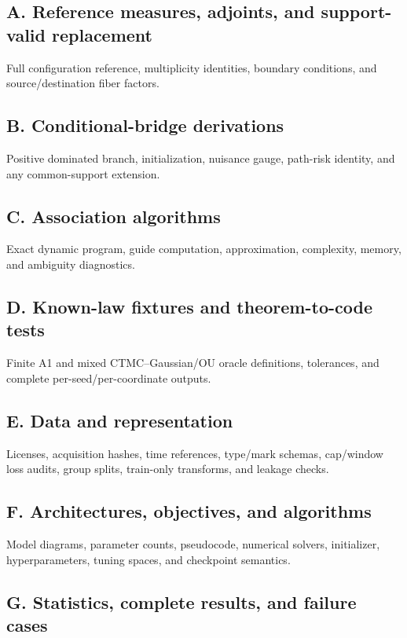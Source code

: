 \documentclass[11pt]{article}
\begin{document}
\subsection*{A. Reference measures, adjoints, and support-valid replacement}

Full configuration reference, multiplicity identities, boundary conditions, and source/\allowbreak{}destination fiber factors.

\subsection*{B. Conditional-bridge derivations}

Positive dominated branch, initialization, nuisance gauge, path-risk identity, and any common-support extension.

\subsection*{C. Association algorithms}

Exact dynamic program, guide computation, approximation, complexity, memory, and ambiguity diagnostics.

\subsection*{D. Known-law fixtures and theorem-to-code tests}

Finite A1 and mixed CTMC--Gaussian/\allowbreak{}OU oracle definitions, tolerances, and complete per-seed/\allowbreak{}per-coordinate outputs.

\subsection*{E. Data and representation}

Licenses, acquisition hashes, time references, type/\allowbreak{}mark schemas, cap/\allowbreak{}window loss audits, group splits, train-only transforms, and leakage checks.

\subsection*{F. Architectures, objectives, and algorithms}

Model diagrams, parameter counts, pseudocode, numerical solvers, initializer, hyperparameters, tuning spaces, and checkpoint semantics.

\subsection*{G. Statistics, complete results, and failure cases}
\end{document}
